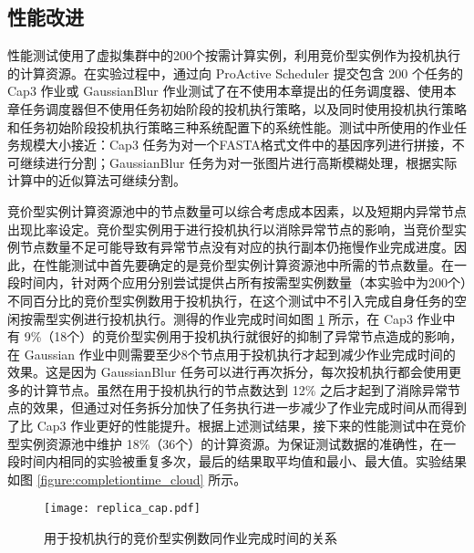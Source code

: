 \subsection{性能改进}
\label{sec:no2_perf}
性能测试使用了虚拟集群中的200个按需计算实例，利用竞价型实例作为投机执行的计算资源。在实验过程中，通过向 ProActive Scheduler 提交包含 200 个任务的 Cap3 作业或 GaussianBlur 作业测试了在不使用本章提出的任务调度器、使用本章任务调度器但不使用任务初始阶段的投机执行策略，以及同时使用投机执行策略和任务初始阶段投机执行策略三种系统配置下的系统性能。测试中所使用的作业任务规模大小接近：Cap3 任务为对一个FASTA格式文件中的基因序列进行拼接，不可继续进行分割；GaussianBlur 任务为对一张图片进行高斯模糊处理，根据实际计算中的近似算法可继续分割。

竞价型实例计算资源池中的节点数量可以综合考虑成本因素，以及短期内异常节点出现比率设定。竞价型实例用于进行投机执行以消除异常节点的影响，当竞价型实例节点数量不足可能导致有异常节点没有对应的执行副本仍拖慢作业完成进度。因此，在性能测试中首先要确定的是竞价型实例计算资源池中所需的节点数量。在一段时间内，针对两个应用分别尝试提供占所有按需型实例数量（本实验中为200个）不同百分比的竞价型实例数用于投机执行，在这个测试中不引入完成自身任务的空闲按需型实例进行投机执行。测得的作业完成时间如图 \ref{figure:replica_cap} 所示，在 Cap3 作业中有 9\%（18个）的竞价型实例用于投机执行就很好的抑制了异常节点造成的影响，在 Gaussian 作业中则需要至少8个节点用于投机执行才起到减少作业完成时间的效果。这是因为 GaussianBlur 任务可以进行再次拆分，每次投机执行都会使用更多的计算节点。虽然在用于投机执行的节点数达到 12\% 之后才起到了消除异常节点的效果，但通过对任务拆分加快了任务执行进一步减少了作业完成时间从而得到了比 Cap3 作业更好的性能提升。根据上述测试结果，接下来的性能测试中在竞价型实例资源池中维护 18\%（36个）的计算资源。为保证测试数据的准确性，在一段时间内相同的实验被重复多次，最后的结果取平均值和最小、最大值。实验结果如图 \ref{figure:completiontime_cloud} 所示。
\begin{figure}
  \centering
  \texttt{[image: replica\_cap.pdf]}
  \caption{用于投机执行的竞价型实例数同作业完成时间的关系}
  \label{figure:replica_cap}
\end{figure}

